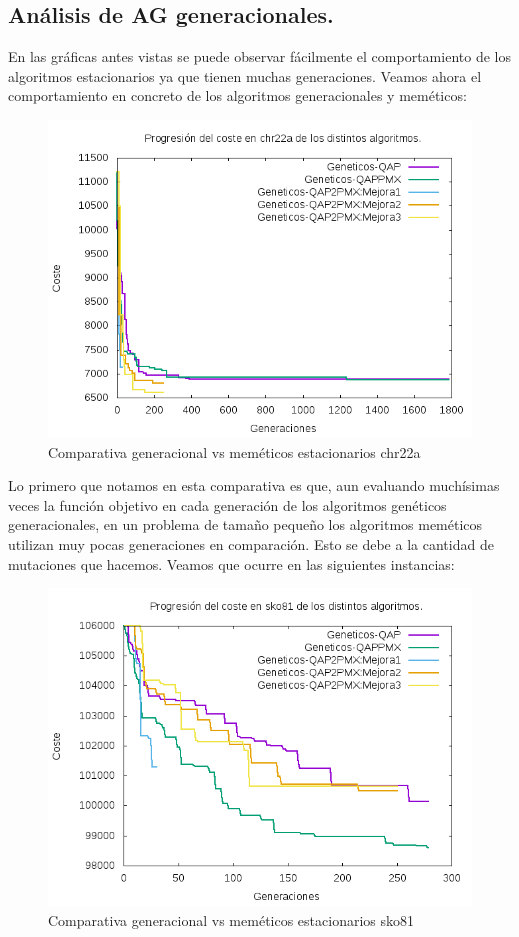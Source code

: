 \subsection{Análisis de AG generacionales.}

En las gráficas antes vistas se puede observar fácilmente el comportamiento de los algoritmos estacionarios ya que tienen muchas generaciones. Veamos ahora el comportamiento en concreto de los algoritmos generacionales y meméticos:

\begin{figure}[H]
\centering
\includegraphics[width=0.7\linewidth]{graficos/comparativaGeneracionalchr22a}
\caption{Comparativa generacional vs meméticos estacionarios chr22a}
\label{fig:comparativaGeneracionalchr22a}
\end{figure}

Lo primero que notamos en esta comparativa es que, aun evaluando muchísimas veces la función objetivo en cada generación de los algoritmos genéticos generacionales, en un problema de tamaño pequeño los algoritmos meméticos utilizan muy pocas generaciones en comparación. Esto se debe a la cantidad de mutaciones que hacemos. Veamos que ocurre en las siguientes instancias:\\

\begin{figure}[H]
\centering
\includegraphics[width=0.7\linewidth]{graficos/comparativaGeneracionalsko81}
\caption{Comparativa generacional vs meméticos estacionarios sko81}
\label{fig:comparativaGeneracionalsko81}
\end{figure}

